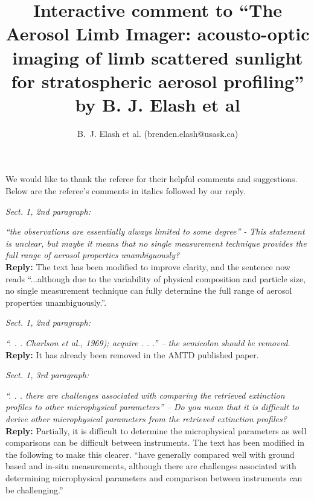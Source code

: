 \documentclass[12pt, notitlepage]{article}
\title{Interactive comment to ``The Aerosol Limb Imager: acousto-optic imaging of limb scattered
sunlight for stratospheric aerosol profiling'' by B. J. Elash et al}
\author{B.~J. Elash et al. (brenden.elash@usask.ca)}
\begin{document}
\begin{titlepage}
\maketitle
\end{titlepage}


We would like to thank the referee for their helpful comments and suggestions. Below are the referee's comments in italics followed by our reply.

\hrulefill

\textit{Sect. 1, 2nd paragraph:}

\textit{``the observations are essentially always limited to some degree'' - This statement is
unclear, but maybe it means that no single measurement technique provides the full
range of aerosol properties unambiguously?}\\

\textbf{Reply:} The text has been modified to improve clarity, and the sentence now reads ``...although due to the variability of physical composition
and particle size, no single measurement technique can fully determine the full range of aerosol properties unambiguously.''.

\hrulefill

\textit{Sect. 1, 2nd paragraph:}

\textit{``. . . Charlson et al., 1969); acquire . . .'' – the semicolon should be removed.}\\

\textbf{Reply:} It has already been removed in the AMTD published paper.

\hrulefill

\textit{Sect. 1, 3rd paragraph:}

\textit{``. . . there are challenges associated with comparing the retrieved extinction profiles
to other microphysical parameters'' – Do you mean that it is difficult to derive other
microphysical parameters from the retrieved extinction profiles?}\\

\textbf{Reply:} Partially, it is difficult to determine the microphysical parameters as well comparisons can be difficult between instruments. The text has been modified in the following to make this clearer. ``have generally compared well with ground based and
in-situ measurements, although there are challenges associated with
determining microphysical
parameters and comparison between instruments can be challenging.''
\end{document}
